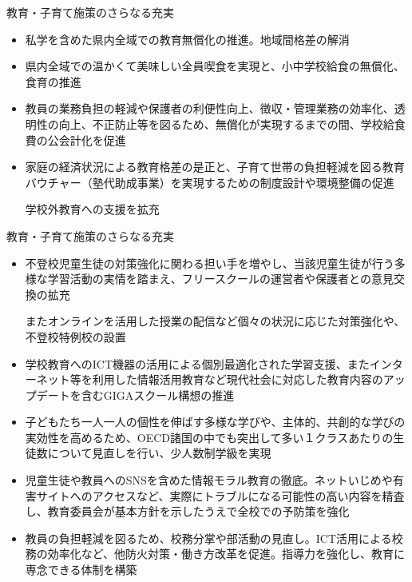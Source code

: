 \documentclass[dvipdfmx]{beamer}
\begin{document}
    \begin{frame}{教育・子育て施策のさらなる充実}{}
        \begin{small}
            \begin{itemize}
                \setlength{\parsep}{.5mm}
                \setlength{\itemsep}{2mm}
                \item 私学を含めた県内全域での教育無償化の推進。地域間格差の解消
                \item 県内全域での温かくて美味しい全員喫食を実現と、小中学校給食の無償化、食育の推進
                \item 教員の業務負担の軽減や保護者の利便性向上、徴収・管理業務の効率化、透明性の向上、不正防止等を図るため、無償化が実現するまでの間、学校給食費の公会計化を促進
                \item 家庭の経済状況による教育格差の是正と、子育て世帯の負担軽減を図る教育バウチャー（塾代助成事業）を実現するための制度設計や環境整備の促進\par
                学校外教育への支援を拡充
            \end{itemize}
        \end{small}
    \end{frame}

    \begin{frame}{教育・子育て施策のさらなる充実}{}
        \begin{small}
            \begin{itemize}
                \setlength{\parsep}{.5mm}
                \setlength{\itemsep}{2mm}
                \item 不登校児童生徒の対策強化に関わる担い手を増やし、当該児童生徒が行う多様な学習活動の実情を踏まえ、フリースクールの運営者や保護者との意見交換の拡充\par
                またオンラインを活用した授業の配信など個々の状況に応じた対策強化や、不登校特例校の設置
                \item 学校教育へのICT機器の活用による個別最適化された学習支援、またインターネット等を利用した情報活用教育など現代社会に対応した教育内容のアップデートを含むGIGAスクール構想の推進
                \item 子どもたち一人一人の個性を伸ばす多様な学びや、主体的、共創的な学びの実効性を高めるため、OECD諸国の中でも突出して多い１クラスあたりの生徒数について見直しを行い、少人数制学級を実現
                \item 児童生徒や教員へのSNSを含めた情報モラル教育の徹底。ネットいじめや有害サイトへのアクセスなど、実際にトラブルになる可能性の高い内容を精査し、教育委員会が基本方針を示したうえで全校での予防策を強化
                \item 教員の負担軽減を図るため、校務分掌や部活動の見直し。ICT活用による校務の効率化など、他防火対策・働き方改革を促進。指導力を強化し、教育に専念できる体制を構築
            \end{itemize}
        \end{small}
    \end{frame}
\end{document}
